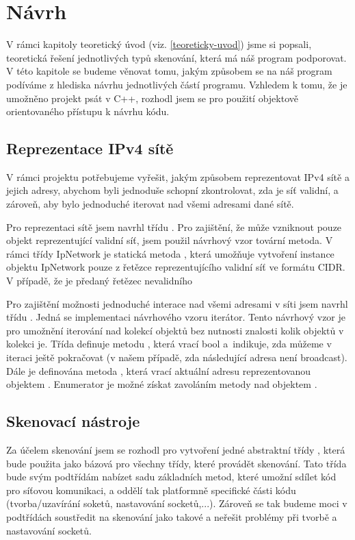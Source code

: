 \documentclass[../projekt.tex]{subfiles}
\begin{document}
\chapter{Návrh}
V rámci kapitoly teoretický úvod (viz. \ref{teoreticky-uvod}) jsme si popsali, teoretická řešení jednotlivých typů skenování, která má náš program podporovat. V této kapitole se budeme věnovat tomu, jakým způsobem se na náš program podíváme z hlediska návrhu jednotlivých částí programu. Vzhledem k tomu, že je umožněno projekt psát v C++, rozhodl jsem se pro použití objektově orientovaného přístupu k návrhu kódu.

\section{Reprezentace IPv4 sítě}
V rámci projektu potřebujeme vyřešit, jakým způsobem reprezentovat IPv4 sítě a jejich adresy, abychom byli jednoduše schopní zkontrolovat, zda je síť validní, a zároveň, aby bylo jednoduché iterovat nad všemi adresami dané sítě.

Pro reprezentaci sítě jsem navrhl třídu . Pro zajištění, že může vzniknout pouze objekt reprezentující validní síť, jsem použil návrhový vzor tovární metoda. V rámci třídy IpNetwork je statická metoda , která umožňuje vytvoření instance objektu IpNetwork pouze z řetězce reprezentujícího validní síť ve formátu CIDR. V případě, že je předaný řetězec nevalidního 

Pro zajištění možnosti jednoduché interace nad všemi adresami v síti jsem navrhl třídu . Jedná se implementaci návrhového vzoru iterátor. Tento návrhový vzor je pro umožnění iterování nad kolekcí objektů bez nutnosti znalosti kolik objektů v kolekci je. Třída  definuje metodu , která vrací bool a~indikuje, zda můžeme v iteraci ještě pokračovat (v našem případě, zda následující adresa není broadcast). Dále je definována metoda , která vrací aktuální adresu reprezentovanou objektem . Enumerator je možné získat zavoláním metody  nad objektem .

\section{Skenovací nástroje}

Za účelem skenování jsem se rozhodl pro vytvoření jedné abstraktní třídy , která bude použita jako bázová pro všechny třídy, které provádět skenování. Tato třída bude svým podtřídám nabízet sadu základních metod, které umožní sdílet kód pro síťovou komunikaci, a oddělí tak platformně specifické části kódu (tvorba/uzavírání soketů, nastavování socketů,...). Zároveň se tak budeme moci v podtřídách  soustředit na skenování jako takové a neřešit problémy při tvorbě a nastavování socketů.
\end{document}
